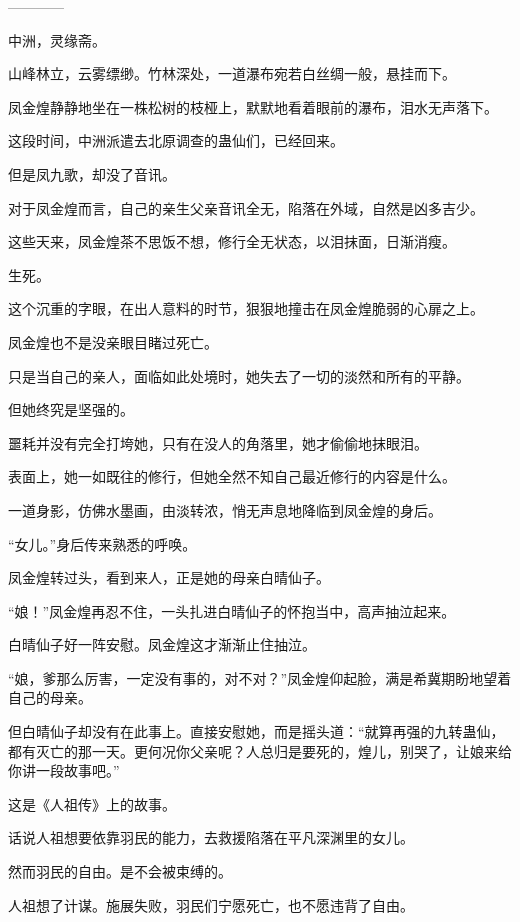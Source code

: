 
\begin{this_body}

------------

中洲，灵缘斋。

山峰林立，云雾缥缈。竹林深处，一道瀑布宛若白丝绸一般，悬挂而下。

凤金煌静静地坐在一株松树的枝桠上，默默地看着眼前的瀑布，泪水无声落下。

这段时间，中洲派遣去北原调查的蛊仙们，已经回来。

但是凤九歌，却没了音讯。

对于凤金煌而言，自己的亲生父亲音讯全无，陷落在外域，自然是凶多吉少。

这些天来，凤金煌茶不思饭不想，修行全无状态，以泪抹面，日渐消瘦。

生死。

这个沉重的字眼，在出人意料的时节，狠狠地撞击在凤金煌脆弱的心扉之上。

凤金煌也不是没亲眼目睹过死亡。

只是当自己的亲人，面临如此处境时，她失去了一切的淡然和所有的平静。

但她终究是坚强的。

噩耗并没有完全打垮她，只有在没人的角落里，她才偷偷地抹眼泪。

表面上，她一如既往的修行，但她全然不知自己最近修行的内容是什么。

一道身影，仿佛水墨画，由淡转浓，悄无声息地降临到凤金煌的身后。

“女儿。”身后传来熟悉的呼唤。

凤金煌转过头，看到来人，正是她的母亲白晴仙子。

“娘！”凤金煌再忍不住，一头扎进白晴仙子的怀抱当中，高声抽泣起来。

白晴仙子好一阵安慰。凤金煌这才渐渐止住抽泣。

“娘，爹那么厉害，一定没有事的，对不对？”凤金煌仰起脸，满是希冀期盼地望着自己的母亲。

但白晴仙子却没有在此事上。直接安慰她，而是摇头道：“就算再强的九转蛊仙，都有灭亡的那一天。更何况你父亲呢？人总归是要死的，煌儿，别哭了，让娘来给你讲一段故事吧。”

这是《人祖传》上的故事。

话说人祖想要依靠羽民的能力，去救援陷落在平凡深渊里的女儿。

然而羽民的自由。是不会被束缚的。

人祖想了计谋。施展失败，羽民们宁愿死亡，也不愿违背了自由。


\end{this_body}

